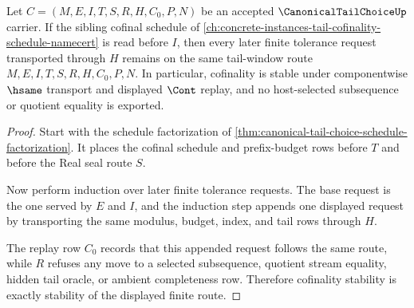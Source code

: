 \begin{theorem}
\label{thm:canonical-tail-choice-cofinality-stability}
Let $C=(M,E,I,T,S,R,H,C_0,P,N)$ be an accepted $\CanonicalTailChoiceUp$ carrier. If the sibling cofinal schedule of \autoref{ch:concrete-instances-tail-cofinality-schedule-namecert} is read before $I$, then every later finite tolerance request transported through $H$ remains on the same tail-window route $M,E,I,T,S,R,H,C_0,P,N$. In particular, cofinality is stable under componentwise $\hsame$ transport and displayed $\Cont$ replay, and no host-selected subsequence or quotient equality is exported.
\end{theorem}
\begin{proof}
Start with the schedule factorization of \autoref{thm:canonical-tail-choice-schedule-factorization}. It places the cofinal schedule and prefix-budget rows before $T$ and before the Real seal route $S$.

Now perform induction over later finite tolerance requests. The base request is the one served by $E$ and $I$, and the induction step appends one displayed request by transporting the same modulus, budget, index, and tail rows through $H$.

The replay row $C_0$ records that this appended request follows the same route, while $R$ refuses any move to a selected subsequence, quotient stream equality, hidden tail oracle, or ambient completeness row. Therefore cofinality stability is exactly stability of the displayed finite route.
\end{proof}

